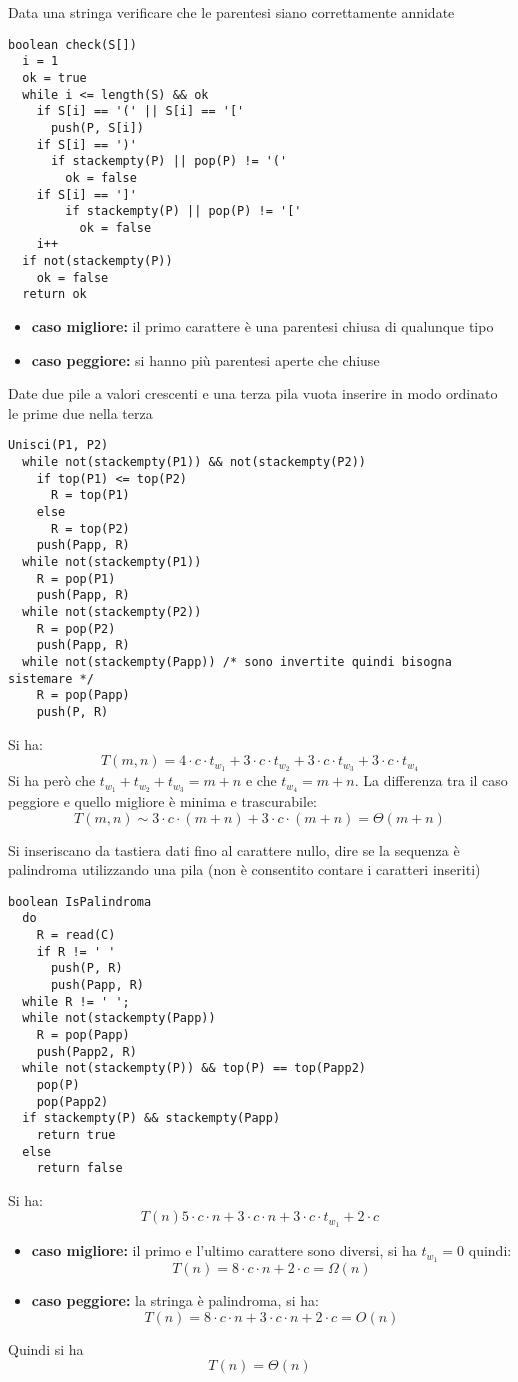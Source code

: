 \documentclass[a4paper,12pt,oneside,tikz]{book}
\begin{document}
\begin{esercizio}
Data una stringa verificare che le parentesi siano correttamente annidate
\begin{verbatim}
boolean check(S[])
  i = 1
  ok = true
  while i <= length(S) && ok
    if S[i] == '(' || S[i] == '['
      push(P, S[i])
    if S[i] == ')'
      if stackempty(P) || pop(P) != '('
        ok = false
    if S[i] == ']'
        if stackempty(P) || pop(P) != '['
          ok = false
    i++
  if not(stackempty(P))
    ok = false
  return ok
\end{verbatim} 
\begin{itemize}
\item \textbf{caso migliore:} il primo carattere è una parentesi chiusa di qualunque tipo
\item \textbf{caso peggiore:} si hanno più parentesi aperte che chiuse
\end{itemize}
\end{esercizio}
\begin{esercizio}
Date due pile a valori crescenti e una terza pila vuota inserire in modo ordinato le prime due nella terza
\begin{verbatim}
Unisci(P1, P2)
  while not(stackempty(P1)) && not(stackempty(P2))
    if top(P1) <= top(P2)
      R = top(P1)
    else
      R = top(P2)
    push(Papp, R)
  while not(stackempty(P1))
    R = pop(P1)
    push(Papp, R)
  while not(stackempty(P2))
    R = pop(P2)
    push(Papp, R)
  while not(stackempty(Papp)) /* sono invertite quindi bisogna sistemare */
    R = pop(Papp)
    push(P, R)
\end{verbatim}
Si ha:
$$T(m,n)=4\cdot c\cdot t_{w_1}+3\cdot c\cdot t_{w_2}+3\cdot c\cdot t_{w_3}+3\cdot c\cdot t_{w_4}$$
Si ha però che $t_{w_1}+t_{w_2}+t_{w_3}=m+n$ e che $t_{w_4}=m+n$. La differenza tra il caso peggiore e quello migliore è minima e trascurabile:
$$T(m,n)\sim 3\cdot c\cdot (m+n)+3\cdot c\cdot (m+n)=\Theta(m+n)$$
\end{esercizio}
\begin{esercizio}
Si inseriscano da tastiera dati fino al carattere nullo, dire se la sequenza è palindroma utilizzando una pila (non è consentito contare i caratteri inseriti)
\begin{verbatim}
boolean IsPalindroma
  do
    R = read(C)
    if R != ' '
      push(P, R)
      push(Papp, R)
  while R != ' ';
  while not(stackempty(Papp))
    R = pop(Papp)
    push(Papp2, R)
  while not(stackempty(P)) && top(P) == top(Papp2)
    pop(P)
    pop(Papp2)
  if stackempty(P) && stackempty(Papp)
    return true
  else
    return false
\end{verbatim}
Si ha:
$$T(n)5\cdot c\cdot n+3\cdot c\cdot n+3\cdot c\cdot t_{w_1}+2\cdot c$$
\begin{itemize}
\item \textbf{caso migliore:} il primo e l'ultimo carattere sono diversi, si ha $t_{w_1}=0$ quindi:
$$T(n)=8\cdot c\cdot n+2\cdot c=\Omega(n)$$
\item \textbf{caso peggiore:} la stringa è palindroma, si ha:
$$T(n)=8\cdot c\cdot n+3\cdot c\cdot n+2\cdot c=O(n)$$
\end{itemize}
Quindi si ha $$T(n)=\Theta(n)$$
\end{esercizio}
\end{document}

